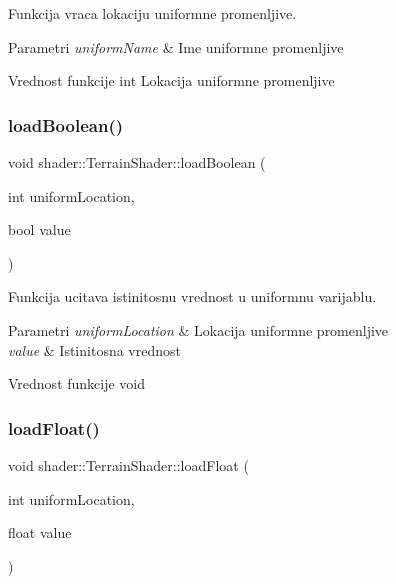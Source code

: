 Funkcija vraca lokaciju uniformne promenljive. 


\begin{DoxyParams}{Parametri}
{\em uniform\+Name} & Ime uniformne promenljive \\
\hline
\end{DoxyParams}
\begin{DoxyReturn}{Vrednost funkcije}
int Lokacija uniformne promenljive 
\end{DoxyReturn}
\mbox{\label{classshader_1_1TerrainShader_adba13f15120aff8a5015955afed332b2}} 
\subsubsection{\texorpdfstring{load\+Boolean()}{loadBoolean()}}
{\footnotesize\ttfamily void shader\+::\+Terrain\+Shader\+::load\+Boolean (\begin{DoxyParamCaption}\item[{int}]{uniform\+Location,  }\item[{bool}]{value }\end{DoxyParamCaption})}



Funkcija ucitava istinitosnu vrednost u uniformnu varijablu. 


\begin{DoxyParams}{Parametri}
{\em uniform\+Location} & Lokacija uniformne promenljive \\
\hline
{\em value} & Istinitosna vrednost \\
\hline
\end{DoxyParams}
\begin{DoxyReturn}{Vrednost funkcije}
void 
\end{DoxyReturn}
\mbox{\label{classshader_1_1TerrainShader_a9d4a75f7aa0ab0834dbef2d147919c47}} 
\subsubsection{\texorpdfstring{load\+Float()}{loadFloat()}}
{\footnotesize\ttfamily void shader\+::\+Terrain\+Shader\+::load\+Float (\begin{DoxyParamCaption}\item[{int}]{uniform\+Location,  }\item[{float}]{value }\end{DoxyParamCaption})}



